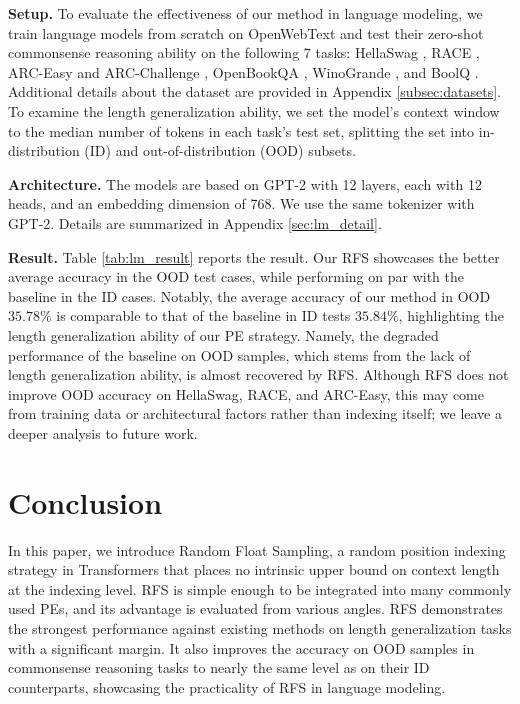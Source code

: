 \documentclass[11pt]{article}
\begin{document}
\noindent\textbf{Setup.} To evaluate the effectiveness of our method in language modeling, we train language models from scratch on OpenWebText \cite{Gokaslan2019OpenWeb} and test their zero-shot commonsense reasoning ability on the following 7 tasks: HellaSwag \cite{zellers2019hellaswag}, RACE \cite{lai-etal-2017-race}, ARC-Easy and ARC-Challenge \cite{Clark2018ThinkYH_arc}, OpenBookQA \cite{OpenBookQA2018}, WinoGrande \cite{sakaguchi2019winogrande}, and BoolQ \cite{boolq}. Additional details about the dataset are provided in Appendix \ref{subsec:datasets}. 
To examine the length generalization ability, we set the model’s context window to the median number of tokens in each task’s test set, splitting the set into in-distribution (ID) and out-of-distribution (OOD) subsets.

\noindent\textbf{Architecture.} The models are based on GPT-2 \cite{radford2019language} with 12 layers, each with 12 heads, and an embedding dimension of 768. 
We use the same tokenizer with GPT-2.
Details are summarized in Appendix \ref{sec:lm_detail}.

\noindent\textbf{Result.} Table \ref{tab:lm_result} reports the result. Our RFS showcases the better average accuracy in the OOD test cases, while performing on par with the baseline in the ID cases. Notably, the average accuracy of our method in OOD $35.78\%$ is comparable to that of the baseline in ID tests $35.84\%$, highlighting the length generalization ability of our PE strategy. Namely, the degraded performance of the baseline on OOD samples, which stems from the lack of length generalization ability, is almost recovered by RFS.
Although RFS does not improve OOD accuracy on HellaSwag, RACE, and ARC-Easy, this may come from training data or architectural factors rather than indexing itself; we leave a deeper analysis to future work.

\section{Conclusion}

In this paper, we introduce Random Float Sampling, a random position indexing strategy in Transformers that places no intrinsic upper bound on context length at the indexing level. RFS is simple enough to be integrated into many commonly used PEs, and its advantage is evaluated from various angles. RFS demonstrates the strongest performance against existing methods on length generalization tasks with a significant margin. It also improves the accuracy on OOD samples in commonsense reasoning tasks to nearly the same level as on their ID counterparts, showcasing the practicality of RFS in language modeling.
\end{document}
